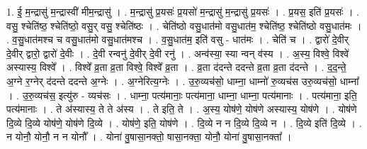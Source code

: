 \documentclass[17pt]{extarticle}
\begin{document}
1. ई॒ म॒न्द्रासु॑ म॒न्द्रास्वी॑ मीम॒न्द्रासु॑ । . म॒न्द्रासु॑ प्र॒यसः॑ प्र॒यसो॑ म॒न्द्रासु॑ म॒न्द्रासु॑ प्र॒यसः॑ । . प्र॒यस॒ इति॑ प्र॒यसः॑ । . वसु॒ श्चेति॑ष्ठ॒ श्चेति॑ष्ठो॒ वसु॒र् वसु॒ श्चेति॑ष्ठः । . चेति॑ष्ठो वसु॒धात॑मो वसु॒धात॑म॒ श्चेति॑ष्ठ॒ श्चेति॑ष्ठो वसु॒धात॑मः । . व॒सु॒धात॑मश्च च वसु॒धात॑मो वसु॒धात॑मश्च । . व॒सु॒धात॑म॒ इति॑ वसु - धात॑मः । . चेति॑ च । . द्वारो॑ दे॒वीर् दे॒वीर् द्वारो॒ द्वारो॑ दे॒वीः । . दे॒वी रन्वनु॑ दे॒वीर् दे॒वी रनु॑ । . अन्व॑स्या॒ स्या न्वन् व॑स्य । . अ॒स्य॒ विश्वे॒ विश्वे॑ अस्यास्य॒ विश्वे᳚ । . विश्वे᳚ व्र॒ता व्र॒ता विश्वे॒ विश्वे᳚ व्र॒ता । . व्र॒ता द॑दन्ते ददन्ते व्र॒ता व्र॒ता द॑दन्ते । . द॒द॒न्ते॒ अ॒ग्ने र॒ग्नेर् द॑दन्ते ददन्ते अ॒ग्नेः । . अ॒ग्नेरित्य॒ग्नेः । . उ॒रु॒व्यच॑सो॒ धाम्ना॒ धाम्नो॑ रु॒व्यच॑स उरु॒व्यच॑सो॒ धाम्ना᳚ । . उ॒रु॒व्यच॑स॒ इत्यु॑रु - व्यच॑सः । . धाम्ना॒ पत्य॑मानाः॒ पत्य॑माना॒ धाम्ना॒ धाम्ना॒ पत्य॑मानाः । . पत्य॑माना॒ इति॒ पत्य॑मानाः । . ते अ॑स्यास्य॒ ते ते अ॑स्य । . ते इति॒ ते । . अ॒स्य॒ योष॑णे॒ योष॑णे अस्यास्य॒ योष॑णे । . योष॑णे दि॒व्ये दि॒व्ये योष॑णे॒ योष॑णे दि॒व्ये । . योष॑णे॒ इति॒ योष॑णे । . दि॒व्ये न न दि॒व्ये दि॒व्ये न । . दि॒व्ये इति॑ दि॒व्ये । . न योनौ॒ योनौ॒ न न योनौ᳚ । . योना॑ वु॒षासा॒नक्तो॒ षासा॒नक्ता॒ योनौ॒ योना॑ वु॒षासा॒नक्ता᳚ । \newline
\end{document}

